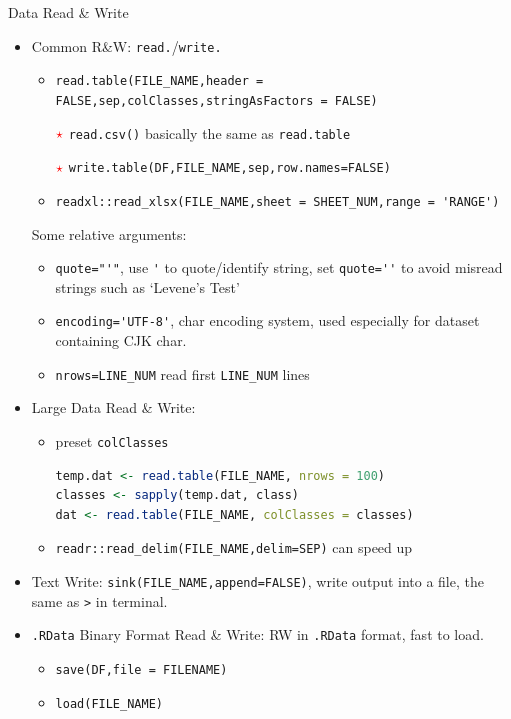     
\begin{point}
    Data Read \& Write
\end{point}
\begin{itemize}[topsep=2pt,itemsep=0pt]
    \item Common R\&W: \lstinline|read.|/\lstinline|write.|
    \begin{itemize}[topsep=2pt,itemsep=0pt]
        \item \lstinline|read.table(FILE_NAME,header = FALSE,sep,colClasses,stringAsFactors = FALSE)|
        \item[${\color{red}\star }$] \lstinline|read.csv()| basically the same as \lstinline|read.table|
        \item[${\color{red}\star }$] \lstinline|write.table(DF,FILE_NAME,sep,row.names=FALSE)|
        \item \lstinline|readxl::read_xlsx(FILE_NAME,sheet = SHEET_NUM,range = 'RANGE')|
    \end{itemize}

    Some relative arguments:
    \begin{itemize}[topsep=2pt,itemsep=0pt]
        \item \lstinline|quote="'"|, use \lstinline|'| to quote/identify string, set \lstinline|quote=''| to avoid misread strings such as `Levene's Test'
        \item \lstinline|encoding='UTF-8'|, char encoding system, used especially for dataset containing CJK char.
        \item \lstinline|nrows=LINE_NUM| read first \lstinline|LINE_NUM| lines
    \end{itemize}

    \item Large Data Read \& Write: 
    \begin{itemize}[topsep=2pt,itemsep=0pt]
        \item preset \lstinline|colClasses|
        
\begin{lstlisting}[language=R]
temp.dat <- read.table(FILE_NAME, nrows = 100)
classes <- sapply(temp.dat, class)
dat <- read.table(FILE_NAME, colClasses = classes)
\end{lstlisting}
        \item \lstinline|readr::read_delim(FILE_NAME,delim=SEP)| can speed up
    \end{itemize}
    
    \item Text Write: \lstinline|sink(FILE_NAME,append=FALSE)|, write output into a file, the same as \lstinline|>| in terminal.
    \item \lstinline|.RData| Binary Format Read \& Write: RW in \lstinline|.RData| format, fast to load.
    \begin{itemize}[topsep=2pt,itemsep=0pt]
        \item \lstinline|save(DF,file = FILENAME)|
        \item \lstinline|load(FILE_NAME)|
    \end{itemize}
\end{itemize}

